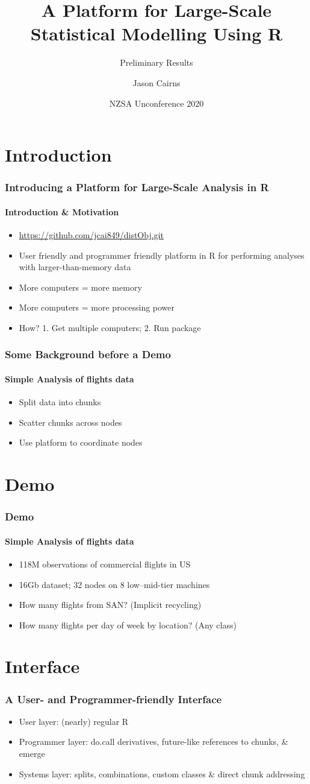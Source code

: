 \documentclass[handout]{beamer}
\title{A Platform for Large-Scale Statistical Modelling Using R}
\subtitle{Preliminary Results}
\author{Jason Cairns}
\institute{University of Auckland}
\date{NZSA Unconference 2020}
\begin{document}
\frame{\titlepage}

\section{Introduction}
	\begin{frame}
		\frametitle{Introducing a Platform for Large-Scale Analysis in R}
		\framesubtitle{Introduction \& Motivation}
		\begin{itemize}
			\item \url{https://github.com/jcai849/distObj.git}
			\item User friendly and programmer friendly platform in
				R for performing analyses with
				larger-than-memory data
			\item More computers = more memory
			\item More computers = more processing power
			\item How? 1. Get multiple computers; 2. Run package
		\end{itemize}
	\end{frame}
	\begin{frame}
		\frametitle{Some Background before a Demo}
		\framesubtitle{Simple Analysis of flights data}
		\begin{itemize}
			\item Split data into chunks
			\item Scatter chunks across nodes
			\item Use platform to coordinate nodes
		\end{itemize}
	\end{frame}
\section{Demo}
	\begin{frame}
		\frametitle{Demo}
		\framesubtitle{Simple Analysis of flights data}
		\begin{itemize}
			\item 118M observations of commercial flights in US
			\item 16Gb dataset; 32 nodes on 8 low--mid-tier machines
			\item How many flights from SAN? (Implicit recycling)
			\item How many flights per day of week by location?
				(Any class)
		\end{itemize}
	\end{frame}
\section{Interface}
	\begin{frame}
		\frametitle{A User- and Programmer-friendly Interface}
		\begin{itemize}
			\item User layer: (nearly) regular R
			\item Programmer layer: do.call derivatives,
				future-like references to chunks, \& emerge
			\item Systems layer: splits, combinations, custom
				classes \& direct chunk addressing
		\end{itemize}
	\end{frame}
\end{document}
